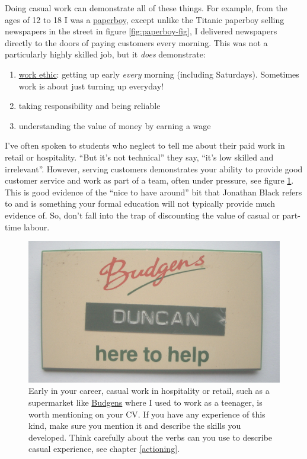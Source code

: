 \documentclass[
]{book}
\providecommand{\tightlist}{%
  \setlength{\itemsep}{0pt}\setlength{\parskip}{0pt}}
\begin{document}
Doing casual work can demonstrate all of these things. For example, from the ages of 12 to 18 I was a \href{https://en.wikipedia.org/wiki/Paperboy}{paperboy}, except unlike the Titanic paperboy selling newspapers in the street in figure \ref{fig:paperboy-fig}, I delivered newspapers directly to the doors of paying customers every morning. This was not a particularly highly skilled job, but it \emph{does} demonstrate:

\begin{enumerate}
\def\labelenumi{\arabic{enumi}.}
\tightlist
\item
  \href{https://en.wikipedia.org/wiki/Work_ethic}{work ethic}: getting up early \emph{every} morning (including Saturdays). Sometimes work is about just turning up everyday!
\item
  taking responsibility and being reliable
\item
  understanding the value of money by earning a wage
\end{enumerate}

I've often spoken to students who neglect to tell me about their paid work in retail or hospitality. ``But it's not technical'' they say, ``it's low skilled and irrelevant''. However, serving customers demonstrates your ability to provide good customer service and work as part of a team, often under pressure, see figure \ref{fig:budgens-fig}. This is good evidence of the ``nice to have around'' bit that Jonathan Black refers to \citep{topnotchcv} and is something your formal education will not typically provide much evidence of. So, don't fall into the trap of discounting the value of casual or part-time labour.

\begin{figure}

{\centering \includegraphics[width=1\linewidth]{images/budgens} 

}

\caption{Early in your career, casual work in hospitality or retail, such as a supermarket like \href{https://en.wikipedia.org/wiki/Budgens}{Budgens} where I used to work as a teenager, is worth mentioning on your CV. If you have any experience of this kind, make sure you mention it and describe the skills you developed. Think carefully about the verbs can you use to describe casual experience, see chapter \ref{actioning}.}\label{fig:budgens-fig}
\end{figure}
\end{document}
